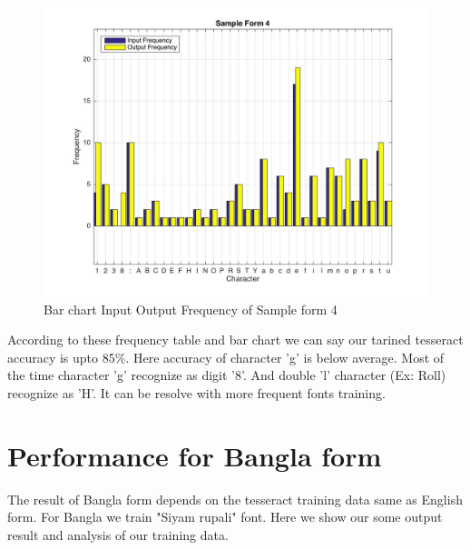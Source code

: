 \begin{figure}[H]
\centering
\includegraphics[width=1\textwidth]{Form4}
\caption {Bar chart Input Output Frequency of Sample form 4}
\label {fig:bar4}
\end{figure}

According to these frequency table and bar chart we can say our tarined tesseract accuracy is upto 85\%. Here accuracy of character 'g' is below average. Most of the time character 'g' recognize as digit '8'. And double 'l' character (Ex: Roll) recognize as 'H'. It can be resolve with more frequent fonts training.

\section{Performance for Bangla form}
The result of Bangla form depends on the tesseract training data same as English form. For Bangla we train "Siyam rupali" font. Here we show our some output result and analysis of our training data.
